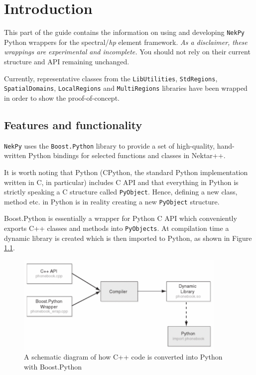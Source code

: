 \chapter{Introduction}

This part of the guide contains the information on using and developing \texttt{NekPy} 
Python wrappers for the \nek{} spectral/\textit{hp} element framework. 
\emph{As a disclaimer, these wrappings are experimental and incomplete.} 
You should not rely on their current structure and API remaining unchanged.

Currently, representative classes from the \texttt{LibUtilities}, \texttt{StdRegions},
\texttt{SpatialDomains}, \texttt{LocalRegions} and \texttt{MultiRegions} libraries 
have been wrapped in order to show the proof-of-concept.

\section{Features and functionality}

\texttt{NekPy} uses the \texttt{Boost.Python} library to provide a set of high-quality,
hand-written Python bindings for selected functions and classes in Nektar++. 

It is worth noting that Python (CPython, the standard Python implementation written in C, 
in particular) includes C API and that everything in Python is strictly speaking a C 
structure called \texttt{PyObject}. Hence, defining a new class, method etc. in Python 
is in reality creating a new \texttt{PyObject} structure.

Boost.Python is essentially a wrapper for Python C API which conveniently exports C++ 
classes and methods into \texttt{PyObjects}. At compilation time a dynamic library 
is created which is then imported to Python, as shown in Figure \ref{fig:boost_python}. 

\begin{figure}[h!]
	\centering
    \includegraphics[width=0.9\textwidth]{img/boost_python}
    \caption{A schematic diagram of how C++ code is converted into Python with Boost.Python \cite{C++Api}}
    \label{fig:boost_python}
\end{figure}


